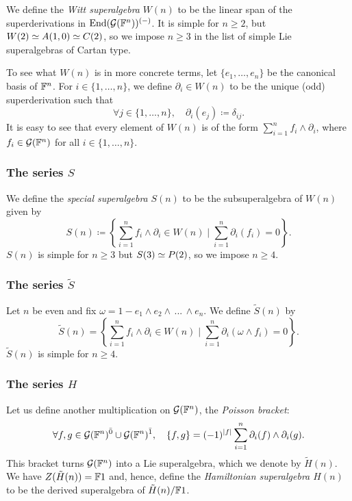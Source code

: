 We define the \emph{Witt superalgebra} $W(n)$ to be the linear span of the superderivations in $\operatorname{End}(\mathcal G(\mathbb{F}^n))^{(-)}$. 
It is simple for $n\geq 2$, but $W(2)\simeq A(1,0)\simeq C(2)$, so we impose $n\geq 3$ in the list of simple Lie superalgebras of Cartan type. 

To see what $W(n)$ is in more concrete terms, let $\{e_1,\ldots,e_n\}$ be the canonical basis of $\mathbb{F}^n$. 
For $i\in \{1, \ldots ,n\}$, we define $\partial_i \in W(n)$ to be the unique (odd) superderivation such that 
\[
    \forall j\in \{1,\ldots ,n\}, \quad 
    \partial_i (e_j) \coloneqq  \delta_{ij}.
\]
It is easy to see that every element of $W(n)$ is of the form $\sum_{i=1}^{n} f_i \wedge \partial_i$, where $f_i \in \mathcal G(\mathbb{F}^n)$ for all $i\in\{1, \ldots , n\}$.


\subsubsection{The series $S$}

We define the \emph{special superalgebra} $S(n)$ to be the subsuperalgebra of $W(n)$ given by
\[
	S(n) \coloneqq \left\{ \sum_{i=1}^{n} f_i \wedge \partial_i \in W(n) \mid
	\sum_{i=1}^{n} \partial_i (f_i) =0
	\right\}.
\]
$S(n)$ is simple for $n\geq 3$ but $S(3)\simeq P(2)$, so we impose $n\geq 4$. 

\subsubsection{The series $\tilde S$}

Let $n$ be even and fix $\omega = 1 - e_1\wedge e_2\wedge \, ...\, \wedge e_n$. We define $\tilde S(n)$ by
\[
	\tilde S(n) = \left\{ \sum_{i=1}^{n} f_i \wedge \partial_i \in W(n) \mid
	\sum_{i=1}^{n} \partial_i (\omega \wedge f_i) =0
	\right\}.
\]
$\tilde S(n)$ is simple for $n\geq 4$.

\subsubsection{The series $H$}

Let us define another multiplication on $\mathcal G(\mathbb{F}^n)$, the \emph{Poisson bracket}:
\[
    \forall f,g \in \mathcal G(\mathbb{F}^n)^{\bar0} \cup \mathcal G(\mathbb{F}^n)^{\bar1}, \quad
	\{f,g\}=(-1)^{|f|} \sum_{i=1}^{n} \partial_i(f)\wedge \partial_i(g).
\]
This bracket turns $\mathcal G(\mathbb{F}^n)$ into a Lie superalgebra, which we denote by $\tilde{H}(n)$. 
We have $Z(\tilde{H}(n)) = \mathbb{F}1$ and, hence, define the \emph{Hamiltonian superalgebra $H(n)$} to be the derived superalgebra of $\tilde{H}(n)/\mathbb{F} 1$. 

